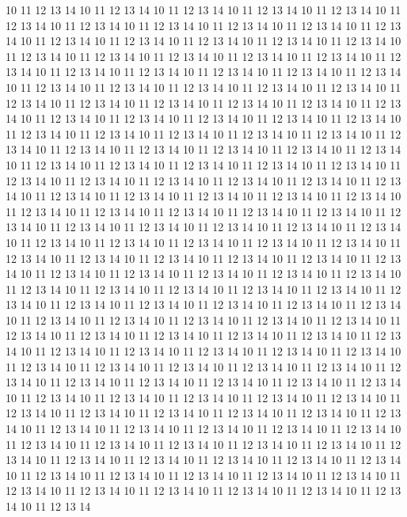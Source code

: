 10 11 12 13 14
10 11 12 13 14
10 11 12 13 14
10 11 12 13 14
10 11 12 13 14
10 11 12 13 14
10 11 12 13 14
10 11 12 13 14
10 11 12 13 14
10 11 12 13 14
10 11 12 13 14
10 11 12 13 14
10 11 12 13 14
10 11 12 13 14
10 11 12 13 14
10 11 12 13 14
10 11 12 13 14
10 11 12 13 14
10 11 12 13 14
10 11 12 13 14
10 11 12 13 14
10 11 12 13 14
10 11 12 13 14
10 11 12 13 14
10 11 12 13 14
10 11 12 13 14
10 11 12 13 14
10 11 12 13 14
10 11 12 13 14
10 11 12 13 14
10 11 12 13 14
10 11 12 13 14
10 11 12 13 14
10 11 12 13 14
10 11 12 13 14
10 11 12 13 14
10 11 12 13 14
10 11 12 13 14
10 11 12 13 14
10 11 12 13 14
10 11 12 13 14
10 11 12 13 14
10 11 12 13 14
10 11 12 13 14
10 11 12 13 14
10 11 12 13 14
10 11 12 13 14
10 11 12 13 14
10 11 12 13 14
10 11 12 13 14
10 11 12 13 14
10 11 12 13 14
10 11 12 13 14
10 11 12 13 14
10 11 12 13 14
10 11 12 13 14
10 11 12 13 14
10 11 12 13 14
10 11 12 13 14
10 11 12 13 14
10 11 12 13 14
10 11 12 13 14
10 11 12 13 14
10 11 12 13 14
10 11 12 13 14
10 11 12 13 14
10 11 12 13 14
10 11 12 13 14
10 11 12 13 14
10 11 12 13 14
10 11 12 13 14
10 11 12 13 14
10 11 12 13 14
10 11 12 13 14
10 11 12 13 14
10 11 12 13 14
10 11 12 13 14
10 11 12 13 14
10 11 12 13 14
10 11 12 13 14
10 11 12 13 14
10 11 12 13 14
10 11 12 13 14
10 11 12 13 14
10 11 12 13 14
10 11 12 13 14
10 11 12 13 14
10 11 12 13 14
10 11 12 13 14
10 11 12 13 14
10 11 12 13 14
10 11 12 13 14
10 11 12 13 14
10 11 12 13 14
10 11 12 13 14
10 11 12 13 14
10 11 12 13 14
10 11 12 13 14
10 11 12 13 14
10 11 12 13 14
10 11 12 13 14
10 11 12 13 14
10 11 12 13 14
10 11 12 13 14
10 11 12 13 14
10 11 12 13 14
10 11 12 13 14
10 11 12 13 14
10 11 12 13 14
10 11 12 13 14
10 11 12 13 14
10 11 12 13 14
10 11 12 13 14
10 11 12 13 14
10 11 12 13 14
10 11 12 13 14
10 11 12 13 14
10 11 12 13 14
10 11 12 13 14
10 11 12 13 14
10 11 12 13 14
10 11 12 13 14
10 11 12 13 14
10 11 12 13 14
10 11 12 13 14
10 11 12 13 14
10 11 12 13 14
10 11 12 13 14
10 11 12 13 14
10 11 12 13 14
10 11 12 13 14
10 11 12 13 14
10 11 12 13 14
10 11 12 13 14
10 11 12 13 14
10 11 12 13 14
10 11 12 13 14
10 11 12 13 14
10 11 12 13 14
10 11 12 13 14
10 11 12 13 14
10 11 12 13 14
10 11 12 13 14
10 11 12 13 14
10 11 12 13 14
10 11 12 13 14
10 11 12 13 14
10 11 12 13 14
10 11 12 13 14
10 11 12 13 14
10 11 12 13 14
10 11 12 13 14
10 11 12 13 14
10 11 12 13 14
10 11 12 13 14
10 11 12 13 14
10 11 12 13 14
10 11 12 13 14
10 11 12 13 14
10 11 12 13 14
10 11 12 13 14
10 11 12 13 14
10 11 12 13 14
10 11 12 13 14
10 11 12 13 14
10 11 12 13 14
10 11 12 13 14
10 11 12 13 14
10 11 12 13 14
10 11 12 13 14
10 11 12 13 14
10 11 12 13 14
10 11 12 13 14
10 11 12 13 14
